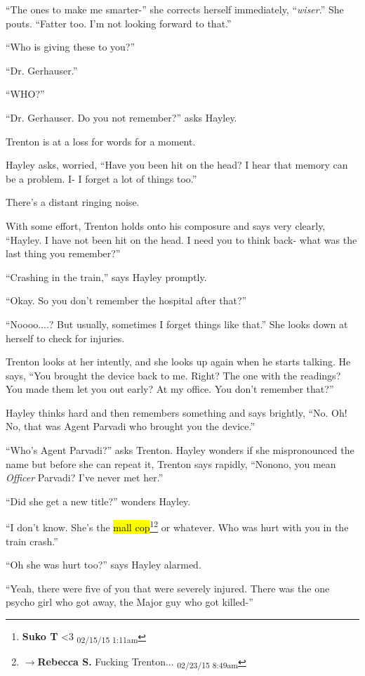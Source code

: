 ``The ones to make me smarter-'' she corrects herself immediately, ``\textit{wiser}.''  She pouts.  ``Fatter too.  I'm not looking forward to that.''

``Who is giving these to you?''

``Dr. Gerhauser.''

``WHO?''

``Dr. Gerhauser.  Do you not remember?'' asks Hayley.

Trenton is at a loss for words for a moment.

Hayley asks, worried, ``Have you been hit on the head?  I hear that memory can be a problem.  I- I forget a lot of things too.''

There's a distant ringing noise.

With some effort, Trenton holds onto his composure and says very clearly, ``Hayley. I have not been hit on the head.  I need you to think back- what was the last thing you remember?''

``Crashing in the train,'' says Hayley promptly.

``Okay.  So you don't remember the hospital after that?''

``Noooo....?  But usually, sometimes I forget things like that.''  She looks down at herself to check for injuries.

Trenton looks at her intently, and she looks up again when he starts talking.  He says, ``You brought the device back to me.  Right?  The one with the readings?  You made them let you out early?  At my office.  You don't remember that?''

Hayley thinks hard and then remembers something and says brightly, ``No.  Oh!  No, that was Agent Parvadi who brought you the device.''

``Who's Agent Parvadi?'' asks Trenton.  Hayley wonders if she mispronounced the name but before she can repeat it, Trenton says rapidly, ``Nonono, you mean\textit{ Officer} Parvadi?  I've never met her.''  

``Did she get a new title?'' wonders Hayley.

``I don't know.  She's the \hl{mall cop}\footnote{\textbf{Suko T }\textless 3 \textsubscript{02/15/15 1:11am}}\footnote{$\rightarrow$\textbf{Rebecca S. }Fucking Trenton... \textsubscript{02/23/15 8:49am}} or whatever.  Who was hurt with you in the train crash.''

``Oh she was hurt too?'' says Hayley alarmed.  

``Yeah, there were five of you that were severely injured.  There was the one psycho girl who got away, the Major guy who got killed-''

